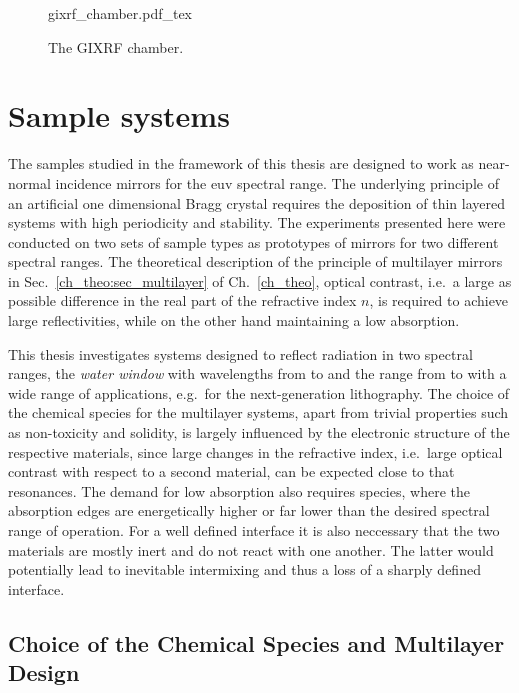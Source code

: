 \begin{figure}[htb]
    \def\svgwidth{\textwidth}
    {gixrf_chamber.pdf_tex}
    \caption[The GIXRF chamber.]{The GIXRF chamber.}
    \label{ch_exp:fig_gixrf_chamber}
\end{figure}

\section{Sample systems}
The samples studied in the framework of this thesis are designed to work as near-normal incidence mirrors for the \gls{euv} spectral range. The underlying principle of an artificial one dimensional Bragg crystal requires the deposition of thin layered systems with high periodicity and stability. The experiments presented here were conducted on two sets of sample types as prototypes of mirrors for two different spectral ranges. The theoretical description of the principle of multilayer mirrors in Sec.~\ref{ch_theo:sec_multilayer} of Ch.~\ref{ch_theo}, optical contrast, i.e.~a large as possible difference in the real part of the refractive index $n$, is required to achieve large reflectivities, while on the other hand maintaining a low absorption.

This thesis investigates systems designed to reflect radiation in two spectral ranges, the \emph{water window} with wavelengths from  to  and the range from  to  with a wide range of applications, e.g.~for the next-generation lithography. The choice of the chemical species for the multilayer systems, apart from trivial properties such as non-toxicity and solidity, is largely influenced by the electronic structure of the respective materials, since large changes in the refractive index, i.e.~large optical contrast with respect to a second material, can be expected close to that resonances. The demand for low absorption also requires species, where the absorption edges are energetically higher or far lower than the desired spectral range of operation. For a well defined interface it is also neccessary that the two materials are mostly inert and do not react with one another. The latter would potentially lead to inevitable intermixing and thus a loss of a sharply defined interface.

\subsection{Choice of the Chemical Species and Multilayer Design}
\label{ch_exp:sec_multilayer_design}

